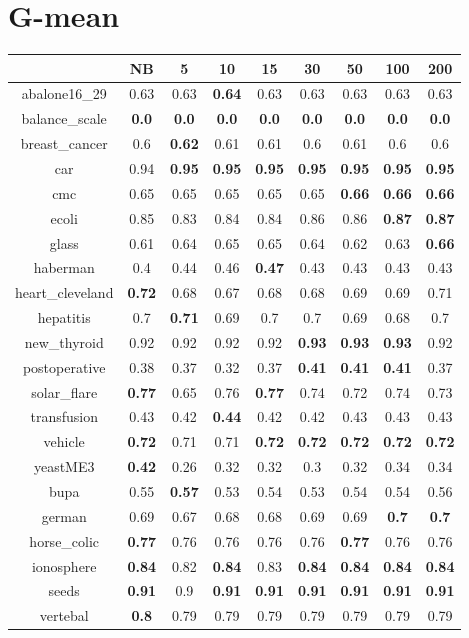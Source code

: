 \documentclass{article}%
\begin{document}
%
\section*{G{-}mean}%
\begin{tabular}{c|cccccccc}%
\hline%
&NB&5&10&15&30&50&100&200\\%
\hline%
abalone16\_29&0.63&0.63&\textbf{0.64}&0.63&0.63&0.63&0.63&0.63\\%
\hline%
balance\_scale&\textbf{0.0}&\textbf{0.0}&\textbf{0.0}&\textbf{0.0}&\textbf{0.0}&\textbf{0.0}&\textbf{0.0}&\textbf{0.0}\\%
\hline%
breast\_cancer&0.6&\textbf{0.62}&0.61&0.61&0.6&0.61&0.6&0.6\\%
\hline%
car&0.94&\textbf{0.95}&\textbf{0.95}&\textbf{0.95}&\textbf{0.95}&\textbf{0.95}&\textbf{0.95}&\textbf{0.95}\\%
\hline%
cmc&0.65&0.65&0.65&0.65&0.65&\textbf{0.66}&\textbf{0.66}&\textbf{0.66}\\%
\hline%
ecoli&0.85&0.83&0.84&0.84&0.86&0.86&\textbf{0.87}&\textbf{0.87}\\%
\hline%
glass&0.61&0.64&0.65&0.65&0.64&0.62&0.63&\textbf{0.66}\\%
\hline%
haberman&0.4&0.44&0.46&\textbf{0.47}&0.43&0.43&0.43&0.43\\%
\hline%
heart\_cleveland&\textbf{0.72}&0.68&0.67&0.68&0.68&0.69&0.69&0.71\\%
\hline%
hepatitis&0.7&\textbf{0.71}&0.69&0.7&0.7&0.69&0.68&0.7\\%
\hline%
new\_thyroid&0.92&0.92&0.92&0.92&\textbf{0.93}&\textbf{0.93}&\textbf{0.93}&0.92\\%
\hline%
postoperative&0.38&0.37&0.32&0.37&\textbf{0.41}&\textbf{0.41}&\textbf{0.41}&0.37\\%
\hline%
solar\_flare&\textbf{0.77}&0.65&0.76&\textbf{0.77}&0.74&0.72&0.74&0.73\\%
\hline%
transfusion&0.43&0.42&\textbf{0.44}&0.42&0.42&0.43&0.43&0.43\\%
\hline%
vehicle&\textbf{0.72}&0.71&0.71&\textbf{0.72}&\textbf{0.72}&\textbf{0.72}&\textbf{0.72}&\textbf{0.72}\\%
\hline%
yeastME3&\textbf{0.42}&0.26&0.32&0.32&0.3&0.32&0.34&0.34\\%
\hline%
bupa&0.55&\textbf{0.57}&0.53&0.54&0.53&0.54&0.54&0.56\\%
\hline%
german&0.69&0.67&0.68&0.68&0.69&0.69&\textbf{0.7}&\textbf{0.7}\\%
\hline%
horse\_colic&\textbf{0.77}&0.76&0.76&0.76&0.76&\textbf{0.77}&0.76&0.76\\%
\hline%
ionosphere&\textbf{0.84}&0.82&\textbf{0.84}&0.83&\textbf{0.84}&\textbf{0.84}&\textbf{0.84}&\textbf{0.84}\\%
\hline%
seeds&\textbf{0.91}&0.9&\textbf{0.91}&\textbf{0.91}&\textbf{0.91}&\textbf{0.91}&\textbf{0.91}&\textbf{0.91}\\%
\hline%
vertebal&\textbf{0.8}&0.79&0.79&0.79&0.79&0.79&0.79&0.79\\%
\hline%
\end{tabular}

%
\end{document}

